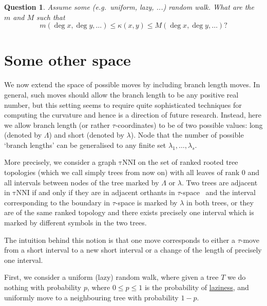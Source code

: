 \documentclass{amsart}
\newtheorem{question}{Question}
\newcommand{\tN}{\mathrm{\tau NNI}}
\begin{document}
\proof

\endproof

\begin{question}
Assume some (e.g.\ uniform, lazy, ...) random walk. What are the $m$ and $M$ 
such that 
\[
m(\deg x,\deg y, \ldots) \leq \kappa(x,y) \leq M(\deg x, \deg y, \ldots)? 
\]
\end{question}

\section{Some other space}

We now extend the space of possible moves by including branch length moves. 
In general, such moves should allow the branch length to be any positive real 
number, but this setting seems to require quite sophisticated techniques for 
computing the curvature and hence is a direction of future research. 
Instead, here we allow branch length (or rather $\tau$-coordinates) 
to be of two possible values: long (denoted by $\Lambda$) and short (denoted 
by $\lambda$). Node that the number of possible `branch lengths' can be 
generalised to any finite set $\lambda_1,\ldots,\lambda_s$.

More precisely, we consider a graph $\tN$ on the set of ranked rooted tree 
topologies (which we call simply trees from now on) with all leaves of rank 
$0$ and all intervals between nodes of the tree marked by $\Lambda$ or
$\lambda$. Two trees are adjacent in $\tN$ if and only if they are in 
adjacent orthants in $\tau$-space~\cite{Gavryushkin2014-bw} and the interval corresponding 
to the boundary in $\tau$-space is marked by $\lambda$ in both trees, 
or they are of the same ranked topology and there 
exists precisely one interval which is marked by different symbols in 
the two trees. 

The intuition behind this notion is that one move corresponds to either 
a $\tau$-move from a short interval to a new short interval or a change 
of the length of precisely one interval. 

First, we consider a uniform (lazy) random walk, where given a tree $T$ 
we do nothing with probability $p$, where $0\leq p\leq 1$ is the probability of 
\href{https://academichelp.net/wp-content/uploads/2014/01/laziness.jpg}{laziness},
and uniformly move to a neighbouring tree with probability $1-p$. 
\end{document}
